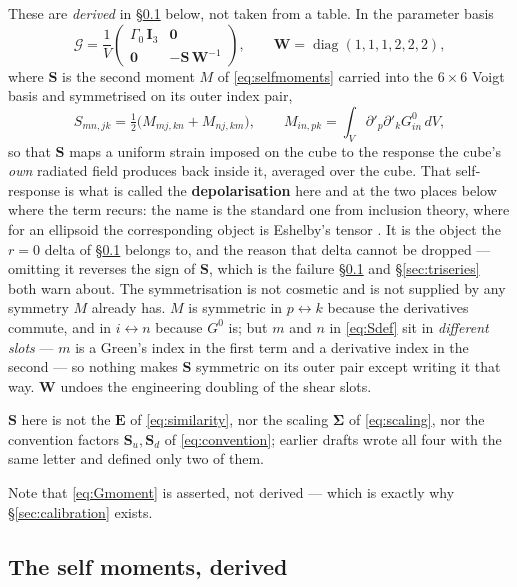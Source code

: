 \documentclass[11pt,a4paper]{article}
\newcommand{\bI}{\mathbf{I}}
\newcommand{\bS}{\mathbf{S}}
\newcommand{\bW}{\mathbf{W}}
\newcommand{\bE}{\mathbf{E}}
\newcommand{\bSig}{\boldsymbol{\Sigma}}
\begin{document}
These are \emph{derived} in \S\ref{sec:moments} below, not taken from a table.
In the parameter basis
\begin{equation}\label{eq:Gmoment}
  \mathcal{G} = \frac{1}{V}
  \begin{pmatrix}\Gamma_0\,\bI_3 & \mathbf{0}\\ \mathbf{0} & -\bS\,\bW^{-1}\end{pmatrix},
  \qquad \bW = \operatorname{diag}(1,1,1,2,2,2),
\end{equation}
where $\bS$ is the second moment $M$ of \eqref{eq:selfmoments} carried into the
$6\times6$ Voigt basis and symmetrised on its outer index pair,
\begin{equation}\label{eq:Sdef}
  S_{mn,jk} = \tfrac12\bigl(M_{mj,kn} + M_{nj,km}\bigr),
  \qquad
  M_{in,pk} = \int_V \partial'_p\partial'_k G^0_{in}\,dV ,
\end{equation}
so that $\bS$ maps a uniform strain imposed on the cube to the response the
cube's \emph{own} radiated field produces back inside it, averaged over the
cube.  That self-response is what is called the \textbf{depolarisation} here and
at the two places below where the term recurs: the name is the standard one from
inclusion theory, where for an ellipsoid the corresponding object is Eshelby's
tensor \cite{eshelby1957}.  It is the object the $r=0$ delta of \S\ref{sec:moments} belongs to, and
the reason that delta cannot be dropped --- omitting it reverses the sign of
$\bS$, which is the failure \S\ref{sec:moments} and \S\ref{sec:triseries} both
warn about.  The symmetrisation is not cosmetic and is not
supplied by any symmetry $M$ already has.  $M$ is symmetric in
$p\leftrightarrow k$ because the derivatives commute, and in
$i\leftrightarrow n$ because $G^0$ is; but $m$ and $n$ in \eqref{eq:Sdef} sit in
\emph{different slots} --- $m$ is a Green's index in the first term and a
derivative index in the second --- so nothing makes $\bS$ symmetric on its outer
pair except writing it that way.  $\bW$ undoes the engineering doubling of the
shear slots.

$\bS$ here is not the $\bE$ of \eqref{eq:similarity}, nor the scaling
$\bSig$ of \eqref{eq:scaling}, nor the convention factors $\bS_u,\bS_d$ of
\eqref{eq:convention}; earlier drafts wrote all four with the same letter and
defined only two of them.

Note that \eqref{eq:Gmoment} is asserted, not derived --- which is exactly why
\S\ref{sec:calibration} exists.

\subsection{The self moments, derived}\label{sec:moments}
\end{document}
